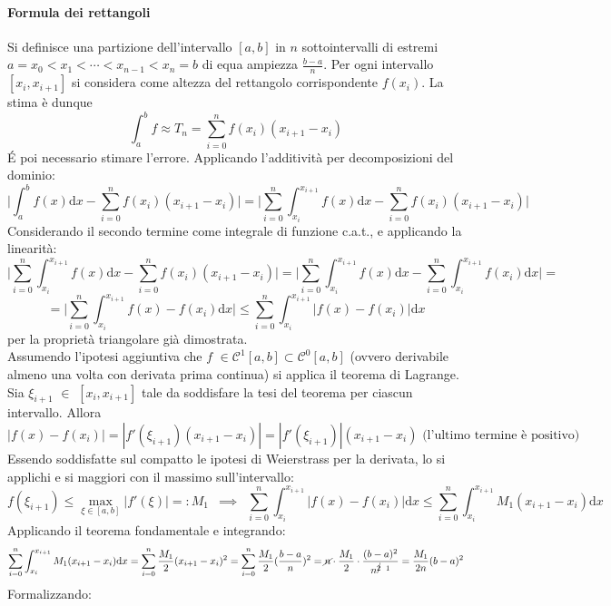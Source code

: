 \documentclass[10pt]{article}
\theoremstyle{plain}
\begin{document}
\paragraph{Formula dei rettangoli}
Si definisce una partizione dell'intervallo $[a,b]$ in $n$ sottointervalli di estremi $a = x_0 < x_1 < \cdots < x_{n-1} < x_n = b$ di equa ampiezza $\frac{b-a}{n}$.
Per ogni intervallo $[x_i, x_{i+1}]$ si considera come altezza del rettangolo corrispondente $f(x_i)$. La stima è dunque
\[\int_a^b f \approx T_n = \sum\limits_{i=0}^n f(x_i) (x_{i+1} - x_i)\]
\'E poi necessario stimare l'errore. Applicando l'additività per decomposizioni del dominio:
\[\bigg|\int_a^b f(x)\textrm{d}x - \sum\limits_{i=0}^n f(x_i) (x_{i+1} - x_i)\bigg| = \bigg|\sum\limits_{i=0}^n \int_{x_i}^{x_{i+1}} f(x)\textrm{d}x - \sum\limits_{i=0}^n f(x_i) (x_{i+1} - x_i)\bigg|\]
Considerando il secondo termine come integrale di funzione c.a.t., e applicando la linearità:
\[\bigg|\sum\limits_{i=0}^n \int_{x_i}^{x_{i+1}} f(x)\textrm{d}x - \sum\limits_{i=0}^n f(x_i) (x_{i+1} - x_i)\bigg| = \bigg|\sum\limits_{i=0}^n \int_{x_i}^{x_{i+1}} f(x)\textrm{d}x - \sum\limits_{i=0}^n \int_{x_i}^{x_{i+1}} f(x_i)\textrm{d}x \bigg| = \]
\[= \bigg|\sum\limits_{i=0}^n \int_{x_i}^{x_{i+1}} f(x) - f(x_i)\textrm{d}x \bigg| \leq \sum\limits_{i=0}^n \int_{x_i}^{x_{i+1}} \big|f(x) - f(x_i)\big|\textrm{d}x\]
per la proprietà triangolare già dimostrata.
\\Assumendo l'ipotesi aggiuntiva che $f$ $\in \mathcal{C}^1[a,b] \subset \mathcal{C}^0[a,b]$ (ovvero derivabile almeno una volta con derivata prima continua) si applica il teorema di Lagrange. Sia $\xi_{i+1}$ $\in$ $[x_i, x_{i+1}]$ tale da soddisfare la tesi del teorema per ciascun intervallo. Allora
\[|f(x) - f(x_i)| = |f'(\xi_{i+1}) (x_{i+1} - x_i)| = |f'(\xi_{i+1})| (x_{i+1} - x_i) \textrm{ (l'ultimo termine è positivo)}\]
Essendo soddisfatte sul compatto le ipotesi di Weierstrass per la derivata, lo si applichi e si maggiori con il massimo sull'intervallo:
\[f(\xi_{i+1}) \leq \max\limits_{\xi \in [a,b]} |f'(\xi)| =: M_1 \enspace \implies \enspace \sum\limits_{i=0}^n \int_{x_i}^{x_{i+1}} \big|f(x) - f(x_i)\big|\textrm{d}x \leq \sum\limits_{i=0}^n \int_{x_i}^{x_{i+1}} M_1 (x_{i+1} - x_i)\textrm{d}x\]
Applicando il teorema fondamentale e integrando:
\[\sum\limits_{i=0}^n \int_{x_i}^{x_{i+1}} M_1 (x_{i+1} - x_i)\textrm{d}x = \sum\limits_{i=0}^n \frac{M_1}{2}(x_{i+1} - x_i)^2 = \sum\limits_{i=0}^n \frac{M_1}{2}(\frac{b-a}{n})^2 = \cancel{n} \cdot \frac{M_1}{2} \cdot \frac{(b-a)^2}{n^{\cancel{2} \enspace 1}} = \frac{M_1}{2n}(b-a)^2\]
Formalizzando:
\end{document}
